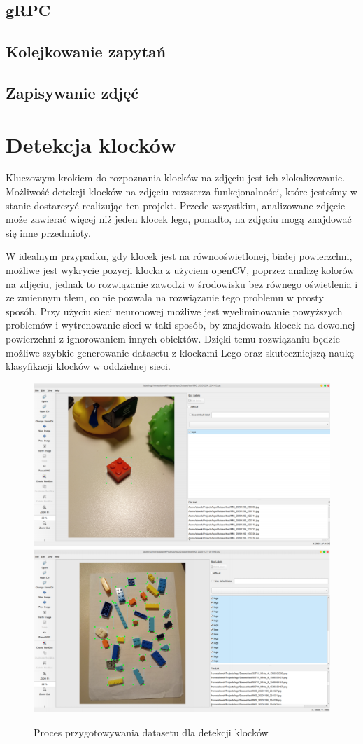 \documentclass[]{article}
\begin{document}
	\subsection{gRPC}
	\subsection{Kolejkowanie zapytań}
	\subsection{Zapisywanie zdjęć}
	\newpage
	\section{Detekcja klocków}
	Kluczowym krokiem do rozpoznania klocków na zdjęciu jest ich zlokalizowanie. Możliwość detekcji klocków na zdjęciu rozszerza funkcjonalności, które jesteśmy w stanie dostarczyć realizując ten projekt. 
	Przede wszystkim, analizowane zdjęcie może zawierać więcej niż jeden klocek lego, ponadto, na zdjęciu mogą znajdować się inne przedmioty. 
	\par
	W idealnym przypadku, gdy klocek jest na równooświetlonej, białej powierzchni,
	możliwe jest wykrycie pozycji klocka z użyciem openCV, poprzez analizę kolorów
	na zdjęciu, jednak to rozwiązanie zawodzi w środowisku bez równego oświetlenia i ze zmiennym tłem, co nie pozwala na rozwiązanie tego problemu w prosty sposób.
	Przy użyciu sieci neuronowej możliwe jest wyeliminowanie powyższych problemów i wytrenowanie sieci w taki sposób, by znajdowała klocek na dowolnej powierzchni z ignorowaniem innych obiektów. Dzięki temu rozwiązaniu będzie możliwe szybkie generowanie datasetu z klockami Lego oraz skuteczniejszą naukę klasyfikacji klocków w oddzielnej sieci.
	
	\begin{figure}[h!]
		\centering
		\includegraphics[width=0.7\linewidth]{images/detection_1}
		\includegraphics[width=0.7\linewidth]{images/detection_2}	
		\caption{Proces przygotowywania datasetu dla detekcji klocków}
	\end{figure}
	
\end{document}
